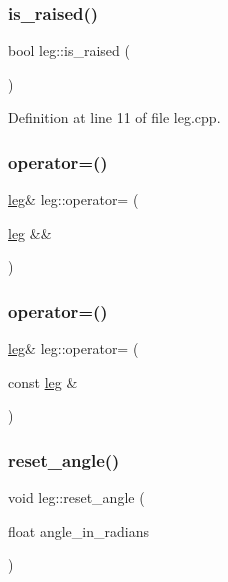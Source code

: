 \subsubsection{\texorpdfstring{is\_raised()}{is\_raised()}}
{\footnotesize\ttfamily bool leg\+::is\+\_\+raised (\begin{DoxyParamCaption}{ }\end{DoxyParamCaption})}



Definition at line 11 of file leg.\+cpp.

\mbox{\label{classleg_a4fe626ec8260c58442d0bf4f6e092e57}} 
\subsubsection{\texorpdfstring{operator=()}{operator=()}\hspace{0.1cm}{\footnotesize\ttfamily [1/2]}}
{\footnotesize\ttfamily \mbox{\hyperlink{classleg}{leg}}\& leg\+::operator= (\begin{DoxyParamCaption}\item[{\mbox{\hyperlink{classleg}{leg}} \&\&}]{ }\end{DoxyParamCaption})\hspace{0.3cm}{\ttfamily [default]}}

\mbox{\label{classleg_ad689d8f971733486c26cc2df5b740bc2}} 
\subsubsection{\texorpdfstring{operator=()}{operator=()}\hspace{0.1cm}{\footnotesize\ttfamily [2/2]}}
{\footnotesize\ttfamily \mbox{\hyperlink{classleg}{leg}}\& leg\+::operator= (\begin{DoxyParamCaption}\item[{const \mbox{\hyperlink{classleg}{leg}} \&}]{ }\end{DoxyParamCaption})\hspace{0.3cm}{\ttfamily [default]}}

\mbox{\label{classleg_add86097d69f6780c1c651693aac6fa4e}} 
\subsubsection{\texorpdfstring{reset\_angle()}{reset\_angle()}}
{\footnotesize\ttfamily void leg\+::reset\+\_\+angle (\begin{DoxyParamCaption}\item[{float}]{angle\+\_\+in\+\_\+radians }\end{DoxyParamCaption})}




